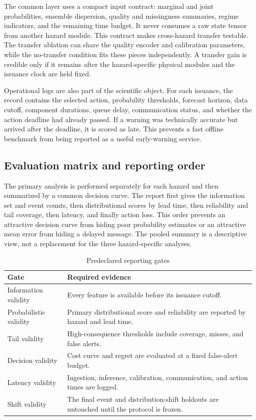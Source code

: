\documentclass[conference]{IEEEtran}
\begin{document}
The common layer uses a compact input contract: marginal and joint probabilities, ensemble dispersion, quality and missingness summaries, regime indicators, and the remaining time budget. It never consumes a raw state tensor from another hazard module. This contract makes cross-hazard transfer testable. The transfer ablation can share the quality encoder and calibration parameters, while the no-transfer condition fits these pieces independently. A transfer gain is credible only if it remains after the hazard-specific physical modules and the issuance clock are held fixed.

Operational logs are also part of the scientific object. For each issuance, the record contains the selected action, probability thresholds, forecast horizon, data cutoff, component durations, queue delay, communication status, and whether the action deadline had already passed. If a warning was technically accurate but arrived after the deadline, it is scored as late. This prevents a fast offline benchmark from being reported as a useful early-warning service.

\subsection{Evaluation matrix and reporting order}

The primary analysis is performed separately for each hazard and then summarized by a common decision curve. The report first gives the information set and event counts, then distributional scores by lead time, then reliability and tail coverage, then latency, and finally action loss. This order prevents an attractive decision curve from hiding poor probability estimates or an attractive mean error from hiding a delayed message. The pooled summary is a descriptive view, not a replacement for the three hazard-specific analyses.

\begin{table}[t]
\caption{Predeclared reporting gates}
\label{tab:gates}
\centering
\footnotesize
\setlength{\tabcolsep}{3pt}
\begin{tabular}{p{}p{}}
\toprule
Gate & Required evidence\\
\midrule
Information validity & Every feature is available before its issuance cutoff.\\
Probabilistic validity & Primary distributional score and reliability are reported by hazard and lead time.\\
Tail validity & High-consequence thresholds include coverage, misses, and false alerts.\\
Decision validity & Cost curve and regret are evaluated at a fixed false-alert budget.\\
Latency validity & Ingestion, inference, calibration, communication, and action times are logged.\\
Shift validity & The final event and distribution-shift holdouts are untouched until the protocol is frozen.\\
\bottomrule
\end{tabular}
\end{table}
\end{document}

